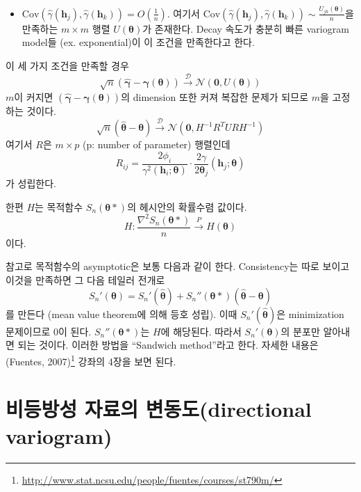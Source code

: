 \documentclass[b5paper,]{scrbook}
\providecommand{\tightlist}{%
  \setlength{\itemsep}{0pt}\setlength{\parskip}{0pt}}
\theoremstyle{plain}
\theoremstyle{definition}
\numberwithin{equation}{section}
\renewcommand{\href}[2]{#2\footnote{\url{#1}}}
\begin{document}
\begin{itemize}
\tightlist
\item
  \(\text{Cov}(\hat{\gamma}(\mathbf{h}_{j}), \hat{\gamma}(\mathbf{h}_{k}))=O(\frac{1}{n})\). 여기서 \(\text{Cov}(\hat{\gamma}(\mathbf{h}_{j}), \hat{\gamma}(\mathbf{h}_{k})) \sim \frac{U_{jk}(\boldsymbol{\theta})}{n}\)을 만족하는 \(m \times m\) 행렬 \(U(\boldsymbol{\theta})\)가 존재한다. Decay 속도가 충분히 빠른 variogram model들 (ex. exponential)이 이 조건을 만족한다고 한다.
\end{itemize}

이 세 가지 조건을 만족할 경우
\[\sqrt{n}(\hat{\boldsymbol{\gamma}}-\boldsymbol{\gamma}(\boldsymbol{\theta}))  \stackrel{\mathcal{D}}{\rightarrow} \mathcal{N}(\mathbf{0}, U(\boldsymbol{\theta}))\]
\(m\)이 커지면 \((\hat{\boldsymbol{\gamma}}-\boldsymbol{\gamma}(\boldsymbol{\theta}))\)의 dimension 또한 커져 복잡한 문제가 되므로 \(m\)을 고정하는 것이다.
\[\sqrt{n}(\hat{\boldsymbol{\theta}}-\boldsymbol{\theta})  \stackrel{\mathcal{D}}{\rightarrow} \mathcal{N}(\mathbf{0}, H^{-1}R^{T}URH^{-1})\]
여기서 \(R\)은 \(m \times p\) (p: number of parameter) 행렬인데
\[R_{ij}=\frac{2\phi_{i}}{\gamma^{2}(\mathbf{h}_{i};\boldsymbol{\theta})}\cdot \frac{2\gamma}{2\boldsymbol{\theta}_{j}}(\mathbf{h}_{j};\boldsymbol{\theta})\]
가 성립한다.

한편 \(H\)는 목적함수 \(S_{n}(\boldsymbol{\theta}*)\)의 헤시안의 확률수렴 값이다.
\[H:\frac{\nabla^{2}S_{n}(\boldsymbol{\theta}*)}{n} \stackrel{P}{\rightarrow} H(\boldsymbol{\theta})\]
이다.

참고로 목적함수의 asymptotic은 보통 다음과 같이 한다. Consistency는 따로 보이고 이것을 만족하면 그 다음 테일러 전개로
\[S_{n}'(\boldsymbol{\theta})=S_{n}'(\hat{\boldsymbol{\theta}})+S_{n}''(\boldsymbol{\theta}*)(\hat{\boldsymbol{\theta}}-\boldsymbol{\theta})\]
를 만든다 (mean value theorem에 의해 등호 성립). 이때 \(S_{n}'(\hat{\boldsymbol{\theta}})\)은 minimization 문제이므로 0이 된다. \(S_{n}''(\boldsymbol{\theta}*)\)는 \(H\)에 해당된다. 따라서 \(S_{n}'(\boldsymbol{\theta})\)의 분포만 알아내면 되는 것이다. 이러한 방법을 ``Sandwich method''라고 한다. 자세한 내용은 \href{http://www.stat.ncsu.edu/people/fuentes/courses/st790m/}{(Fuentes, 2007)} 강좌의 4장을 보면 된다.

\hypertarget{--directional-variogram}{%
\section{비등방성 자료의 변동도(directional variogram)}\label{--directional-variogram}}
\end{document}
